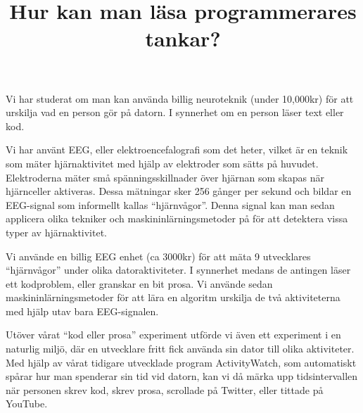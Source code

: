 \documentclass{popsci}
\title{Hur kan man läsa programmerares tankar?}
\begin{document}


\noindent Vi har studerat om man kan använda billig neuroteknik (under 10,000kr) för att urskilja vad en person gör på datorn. I synnerhet om en person läser text eller kod.

Vi har använt EEG, eller elektroencefalografi som det heter, vilket är en teknik som mäter hjärnaktivitet med hjälp av elektroder som sätts på huvudet. Elektroderna mäter små spänningsskillnader över hjärnan som skapas när hjärnceller aktiveras. Dessa mätningar sker 256 gånger per sekund och bildar en EEG-signal som informellt kallas ``hjärnvågor''. Denna signal kan man sedan applicera olika tekniker och maskininlärningsmetoder på för att detektera vissa typer av hjärnaktivitet.


Vi använde en billig EEG enhet (ca 3000kr) för att mäta 9 utvecklares ``hjärnvågor'' under olika datoraktiviteter. I synnerhet medans de antingen läser ett kodproblem, eller granskar en bit prosa. Vi använde sedan maskininlärningsmetoder för att lära en algoritm urskilja de två aktiviteterna med hjälp utav bara EEG-signalen.

Utöver vårat ``kod eller prosa'' experiment utförde vi även ett experiment i en naturlig miljö, där en utvecklare fritt fick använda sin dator till olika aktiviteter. Med hjälp av vårat tidigare utvecklade program ActivityWatch, som automatiskt spårar hur man spenderar sin tid vid datorn, kan vi då märka upp tidsintervallen när personen skrev kod, skrev prosa, scrollade på Twitter, eller tittade på YouTube. 
\end{document}
